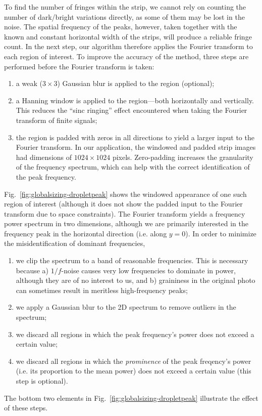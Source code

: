 \documentclass[11.5pt,oneside]{book}
\newcommand*{\figref}[1]{Fig.~\ref{#1}}
\begin{document}
To find the number of fringes within the strip, we cannot rely on counting the
number of dark/bright variations directly, as some of them may be lost in the
noise. The spatial frequency of the peaks, however, taken together with the
known and constant horizontal width of the strips, will produce a reliable
fringe count. In the next step, our algorithm therefore applies the Fourier
transform to each region of interest. To improve the accuracy of the method,
three steps are performed before the Fourier transform is taken:
\begin{enumerate}
    \item a weak ($3 \times 3$) Gaussian blur is applied to the region
        (optional);
    \item a Hanning window is applied to the region---both horizontally and
        vertically. This reduces the ``sinc ringing'' effect encountered when
        taking the Fourier transform of finite signals;
    \item the region is padded with zeros in all directions to yield a larger
        input to the Fourier transform. In our application, the windowed and padded strip
        images had dimensions of $1024 \times 1024$ pixels. Zero-padding
        increases the granularity of the frequency spectrum, which can help with
        the correct identification of the peak frequency.
\end{enumerate}

\figref{fig:globalsizing-dropletpeak} shows the windowed appearance of
one such region of interest (although it does not show the padded input to the
Fourier transform due to space constraints). The Fourier transform yields a
frequency power spectrum in two dimensions, although we are primarily interested
in the frequency peak in the horizontal direction (i.e. along $y=0$). In order
to minimize the misidentification of dominant frequencies,
\begin{enumerate}
    \item we clip the spectrum to a band of reasonable frequencies. This is
        necessary because a) $1/f$-noise causes very low frequencies to dominate
        in power, although they are of no interest to us, and b) graininess in
        the original photo can sometimes result in meritless high-frequency
        peaks;
    \item we apply a Gaussian blur to the 2D spectrum to remove outliers in the
        spectrum;
    \item we discard all regions in which the peak frequency's power does not
        exceed a certain value;
    \item we discard all regions in which the \textit{prominence} of the peak
        freqency's power (i.e. its proportion to the mean power) does not exceed
        a certain value (this step is optional).
\end{enumerate}
The bottom two elements in \figref{fig:globalsizing-dropletpeak} illustrate
the effect of these steps.
\end{document}
